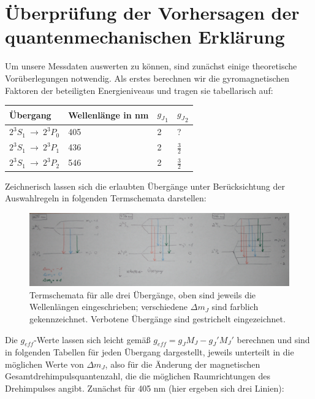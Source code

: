 \section{Überprüfung der Vorhersagen der quantenmechanischen Erklärung}

Um unsere Messdaten auswerten zu können, sind zunächst einige theoretische Vorüberlegungen notwendig. Als erstes berechnen wir die gyromagnetischen Faktoren der beteiligten Energieniveaus und tragen sie tabellarisch auf: 

\begin{center}
  \begin{tabular}{|p{2.2cm}|p{4cm}|p{2cm}|p{2cm}|}
    \hline
    Übergang & Wellenlänge in nm & ${g_J}_1$ & ${g_J}_2$ \\ \hline
    $2^3S_1~\rightarrow~2^3P_0$ & 405 & 2 & ?  \\ \hline
    $2^3S_1~\rightarrow~2^3P_1$ & 436 & 2 & $\frac{3}{2}$ \\ \hline
    $2^3S_1~\rightarrow~2^3P_2$ & 546 & 2 & $\frac{3}{2}$ \\ \hline
	\end{tabular}
\end{center}

Zeichnerisch lassen sich die erlaubten Übergänge unter Berücksichtung der Auswahlregeln in folgenden Termschemata darstellen:

\begin{figure}[H] 
  \centering
     \includegraphics[width=1\textwidth]{data/Termschemata.JPG}
  \caption{Termschemata für alle drei Übergänge, oben sind jeweils die Wellenlängen eingeschrieben; verschiedene $\Delta m_J$ sind farblich gekennzeichnet. Verbotene Übergänge sind gestrichelt eingezeichnet.}
  \label{fig:Bild1}
\end{figure}

Die $g_{eff}$-Werte lassen sich leicht gemäß $g_{eff} = g_J M_J - g_J' M_J'$ berechnen und sind in folgenden Tabellen für jeden Übergang dargestellt, jeweils unterteilt in die möglichen Werte von $\Delta m_J$, also für die Änderung der magnetischen Gesamtdrehimpulsquantenzahl, die die möglichen Raumrichtungen des Drehimpulses angibt. Zunächst für 405 nm (hier ergeben sich drei Linien):

